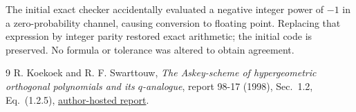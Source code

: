 \documentclass[11pt,a4paper]{article}
\begin{document}
The initial exact checker accidentally evaluated a negative integer
power of $-1$ in a zero-probability channel, causing conversion to
floating point. Replacing that expression by integer parity restored
exact arithmetic; the initial code is preserved. No formula or
tolerance was altered to obtain agreement.

\begin{thebibliography}{9}
 R. Koekoek and R. F. Swarttouw,
\emph{The Askey-scheme of hypergeometric orthogonal polynomials
and its $q$-analogue}, report 98-17 (1998), Sec.~1.2,
Eq.~(1.2.5),
\href{https://tudelft.roelofkoekoek.nl/documents/as98.pdf}{author-hosted report}.
\end{thebibliography}
\end{document}
